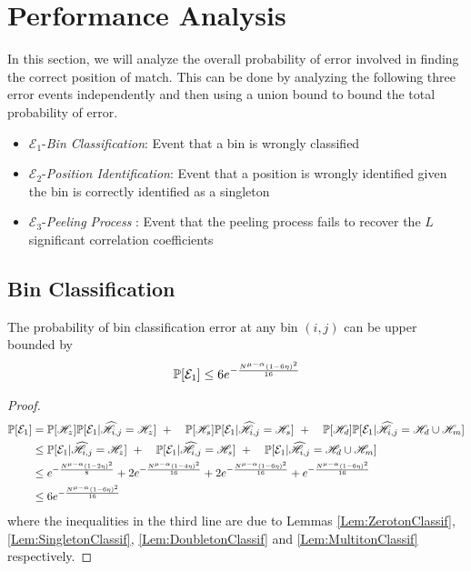 \section{Performance Analysis}
\def\vgap{2pt}
In this section, we will analyze the overall probability of error involved in finding the correct position of match. This can be done by analyzing the following three error events independently and then using a union bound to bound the total probability of error.

\begin{itemize}
	\item $\mathcal{E}_1${-\it Bin Classification}: Event that a bin is wrongly classified
	\item $\mathcal{E}_2${-\it Position Identification}: Event that a position is wrongly identified given the bin is correctly identified as a singleton  
	\item $\mathcal{E}_3${-\it Peeling Process} : Event that the peeling process fails to recover the $L$ significant correlation coefficients
\end{itemize}

\subsection{\bf Bin Classification}
\begin{lemma}
The probability of bin classification error at any bin $(i,j)$ can be upper bounded by
\begin{align*}
\mathbb{P}[\mathcal{E}_1]\leq 6e^{-\frac{N^{\mu-\alpha}(1-6\eta)^2}{16}}
\end{align*}
\end{lemma}

\begin{proof}
\begin{align*}
\mathbb{P}[\mathcal{E}_1]&=\mathbb{P}[\mathscr{H}_z]\mathbb{P}[\mathcal{E}_1|\widehat{\mathscr{H}}_{i,j}=\mathscr{H}_z]~+
						\quad \mathbb{P}[\mathscr{H}_s]\mathbb{P}[\mathcal{E}_1|\widehat{\mathscr{H}}_{i,j}=\mathscr{H}_s]~+
						\quad\mathbb{P}[\mathscr{H}_d]\mathbb{P}[\mathcal{E}_1|\widehat{\mathscr{H}}_{i,j}=\mathscr{H}_d \cup \mathscr{H}_m]\\
				&\leq \mathbb{P}[\mathcal{E}_1|\widehat{\mathscr{H}}_{i,j}=\mathscr{H}_z]~+
						\quad \mathbb{P}[\mathcal{E}_1|\widehat{\mathscr{H}}_{i,j}=\mathscr{H}_s]~+
						\quad \mathbb{P}[\mathcal{E}_1|\widehat{\mathscr{H}}_{i,j}=\mathscr{H}_d \cup \mathscr{H}_m]\\
    			&\leq  e^{-\frac{N^{\mu-\alpha}(1-2\eta)^2}{8}}+2e^{-\frac{N^{\mu-\alpha}(1-4\eta)^2}{16}}+ 2e^{-\frac{N^{\mu-\alpha}(1-6\eta)^2}{16}}+e^{-\frac{N^{\mu-\alpha}(1-6\eta)^2}{16}}\\
    			&\leq 6e^{-\frac{N^{\mu-\alpha}(1-6\eta)^2}{16}}\\
						\end{align*}
						where the inequalities in the third line are due to Lemmas \ref{Lem:ZerotonClassif}, \ref{Lem:SingletonClassif}, \ref{Lem:DoubletonClassif} and \ref{Lem:MultitonClassif} respectively.
\end{proof}

